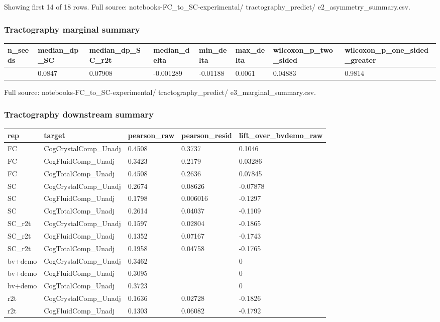 Showing first 14 of 18 rows. Full source: notebooks-FC\_to\_SC-experimental/ tractography\_predict/ e2\_asymmetry\_summary.csv.

\subsubsection{Tractography marginal summary}\label{tractography-marginal-summary}

{\def\LTcaptype{none} %
\begin{longtable}[]{@{}llllllll@{}}
\toprule\noalign{}
n\_seeds & median\_dp\_SC & median\_dp\_SC\_r2t & median\_delta & min\_delta & max\_delta & wilcoxon\_p\_two\_sided & wilcoxon\_p\_one\_sided\_greater \\
\midrule\noalign{}
\endhead
\bottomrule\noalign{}
\endlastfoot
10 & 0.0847 & 0.07908 & -0.001289 & -0.01188 & 0.0061 & 0.04883 & 0.9814 \\
\end{longtable}
}

Full source: notebooks-FC\_to\_SC-experimental/ tractography\_predict/ e3\_marginal\_summary.csv.

\subsubsection{Tractography downstream summary}\label{tractography-downstream-summary}

{\def\LTcaptype{none} %
\begin{longtable}[]{@{}lllll@{}}
\toprule\noalign{}
rep & target & pearson\_raw & pearson\_resid & lift\_over\_bvdemo\_raw \\
\midrule\noalign{}
\endhead
\bottomrule\noalign{}
\endlastfoot
FC & CogCrystalComp\_Unadj & 0.4508 & 0.3737 & 0.1046 \\
FC & CogFluidComp\_Unadj & 0.3423 & 0.2179 & 0.03286 \\
FC & CogTotalComp\_Unadj & 0.4508 & 0.2636 & 0.07845 \\
SC & CogCrystalComp\_Unadj & 0.2674 & 0.08626 & -0.07878 \\
SC & CogFluidComp\_Unadj & 0.1798 & 0.006016 & -0.1297 \\
SC & CogTotalComp\_Unadj & 0.2614 & 0.04037 & -0.1109 \\
SC\_r2t & CogCrystalComp\_Unadj & 0.1597 & 0.02804 & -0.1865 \\
SC\_r2t & CogFluidComp\_Unadj & 0.1352 & 0.07167 & -0.1743 \\
SC\_r2t & CogTotalComp\_Unadj & 0.1958 & 0.04758 & -0.1765 \\
bv+demo & CogCrystalComp\_Unadj & 0.3462 & & 0 \\
bv+demo & CogFluidComp\_Unadj & 0.3095 & & 0 \\
bv+demo & CogTotalComp\_Unadj & 0.3723 & & 0 \\
r2t & CogCrystalComp\_Unadj & 0.1636 & 0.02728 & -0.1826 \\
r2t & CogFluidComp\_Unadj & 0.1303 & 0.06082 & -0.1792 \\
\end{longtable}
}

